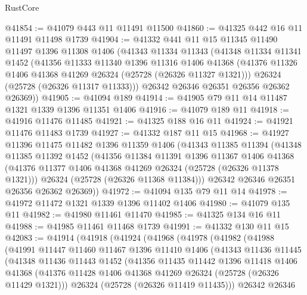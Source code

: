\begin{lexlean}{RustCore}
\begin{coremodule}
@41854 := @41079 @443 @11 @11491 @11500
@41860 := @41325 @442 @16 @11 @11491 @11498 @1739
@41904 := @41332
    @441
    @11
    @15
    @11345
    @11490
    @11497
    @1396
    @11308
    @1406
    (@41343
      @11334
      @11343
      (@41348
        @11334
        @11341
        @1452
        (@41356
          @11333
          @11340
          @1396
          @11316
          @1406
          @41368
          (@41376 @11326 @1406 @41368 @41269 @26324 (@25728 (@26326 @11327 @1321)))
          @26324
          (@25728 (@26326 @11317 @11333)))
        @26342
        @26346
        @26351
        @26356
        @26362
        @26369))
@41905 := @41094 @189
@41914 := @41905 @79 @11 @14 @11487 @1321 @1339 @1396 @11351 @1406
@41916 := @41079 @189 @11
@41918 := @41916 @11476 @11485
@41921 := @41325 @188 @16 @11
@41924 := @41921 @11476 @11483 @1739
@41927 := @41332 @187 @11 @15
@41968 := @41927
    @11396
    @11475
    @11482
    @1396
    @11359
    @1406
    (@41343
      @11385
      @11394
      (@41348
        @11385
        @11392
        @1452
        (@41356
          @11384
          @11391
          @1396
          @11367
          @1406
          @41368
          (@41376 @11377 @1406 @41368 @41269 @26324 (@25728 (@26326 @11378 @1321)))
          @26324
          (@25728 (@26326 @11368 @11384)))
        @26342
        @26346
        @26351
        @26356
        @26362
        @26369))
@41972 := @41094 @135 @79 @11 @14
@41978 := @41972 @11472 @1321 @1339 @1396 @11402 @1406
@41980 := @41079 @135 @11
@41982 := @41980 @11461 @11470
@41985 := @41325 @134 @16 @11
@41988 := @41985 @11461 @11468 @1739
@41991 := @41332 @130 @11 @15
@42083 := @41914
    (@41918
      (@41924
        (@41968
          (@41978
            (@41982
              (@41988
                (@41991
                  @11447
                  @11460
                  @11467
                  @1396
                  @11410
                  @1406
                  (@41343
                    @11436
                    @11445
                    (@41348
                      @11436
                      @11443
                      @1452
                      (@41356
                        @11435
                        @11442
                        @1396
                        @11418
                        @1406
                        @41368
                        (@41376 @11428 @1406 @41368 @41269 @26324 (@25728 (@26326 @11429 @1321)))
                        @26324
                        (@25728 (@26326 @11419 @11435)))
                      @26342
                      @26346

\end{coremodule}
\end{lexlean}
